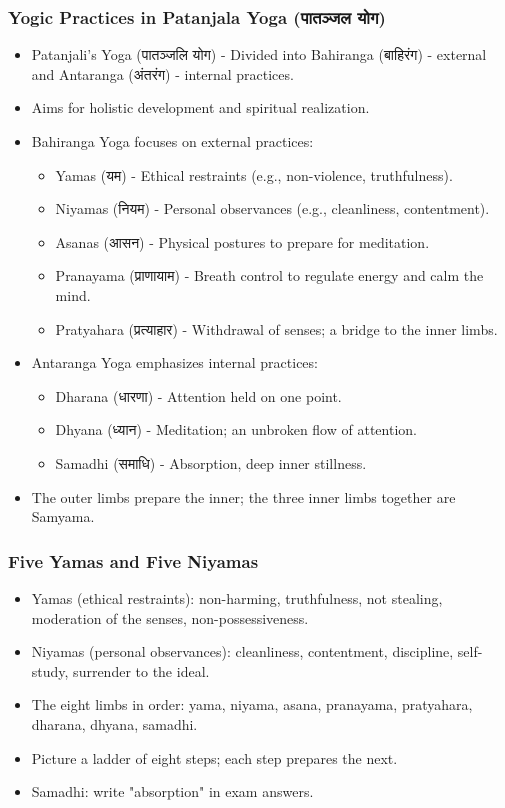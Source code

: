 \begin{frame}[fragile]\frametitle{Yogic Practices in Patanjala Yoga (पातञ्जल योग)}

      \begin{itemize}
		\item Patanjali’s Yoga (पातञ्जलि योग) - Divided into Bahiranga (बाहिरंग) - external and Antaranga (अंतरंग) - internal practices.
		\item Aims for holistic development and spiritual realization.
		\item Bahiranga Yoga focuses on external practices:
		  \begin{itemize}
		      \item Yamas (यम) - Ethical restraints (e.g., non-violence, truthfulness).
		      \item Niyamas (नियम) - Personal observances (e.g., cleanliness, contentment).
		      \item Asanas (आसन) - Physical postures to prepare for meditation.
		      \item Pranayama (प्राणायाम) - Breath control to regulate energy and calm the mind.
		      \item Pratyahara (प्रत्याहार) - Withdrawal of senses; a bridge to the inner limbs.
		  \end{itemize}
		\item Antaranga Yoga emphasizes internal practices:
		  \begin{itemize}
		      \item Dharana (धारणा) - Attention held on one point.
		      \item Dhyana (ध्यान) - Meditation; an unbroken flow of attention.
		      \item Samadhi (समाधि) - Absorption, deep inner stillness.
		  \end{itemize}
		\item The outer limbs prepare the inner; the three inner limbs together are Samyama.
	  \end{itemize}

\end{frame}


\begin{frame}[fragile]\frametitle{Five Yamas and Five Niyamas}

\begin{itemize}
    \item Yamas (ethical restraints): non-harming, truthfulness, not stealing, moderation of the senses, non-possessiveness.
    \item Niyamas (personal observances): cleanliness, contentment, discipline, self-study, surrender to the ideal.
    \item The eight limbs in order: yama, niyama, asana, pranayama, pratyahara, dharana, dhyana, samadhi.
    \item Picture a ladder of eight steps; each step prepares the next.
    \item Samadhi: write "absorption" in exam answers.
\end{itemize}

\end{frame}

